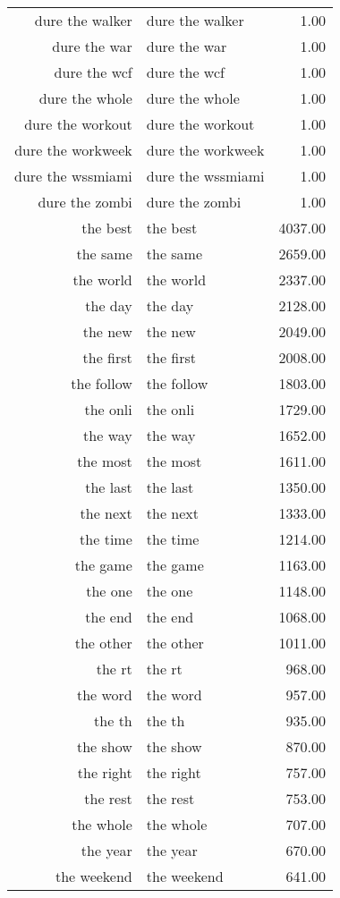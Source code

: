 \begin{table}[ht]
\begin{tabular}{rlr}
  dure the walker & dure the walker & 1.00 \\ 
  dure the war & dure the war & 1.00 \\ 
  dure the wcf & dure the wcf & 1.00 \\ 
  dure the whole & dure the whole & 1.00 \\ 
  dure the workout & dure the workout & 1.00 \\ 
  dure the workweek & dure the workweek & 1.00 \\ 
  dure the wssmiami & dure the wssmiami & 1.00 \\ 
  dure the zombi & dure the zombi & 1.00 \\ 
  the best & the best & 4037.00 \\ 
  the same & the same & 2659.00 \\ 
  the world & the world & 2337.00 \\ 
  the day & the day & 2128.00 \\ 
  the new & the new & 2049.00 \\ 
  the first & the first & 2008.00 \\ 
  the follow & the follow & 1803.00 \\ 
  the onli & the onli & 1729.00 \\ 
  the way & the way & 1652.00 \\ 
  the most & the most & 1611.00 \\ 
  the last & the last & 1350.00 \\ 
  the next & the next & 1333.00 \\ 
  the time & the time & 1214.00 \\ 
  the game & the game & 1163.00 \\ 
  the one & the one & 1148.00 \\ 
  the end & the end & 1068.00 \\ 
  the other & the other & 1011.00 \\ 
  the rt & the rt & 968.00 \\ 
  the word & the word & 957.00 \\ 
  the th & the th & 935.00 \\ 
  the show & the show & 870.00 \\ 
  the right & the right & 757.00 \\ 
  the rest & the rest & 753.00 \\ 
  the whole & the whole & 707.00 \\ 
  the year & the year & 670.00 \\ 
  the weekend & the weekend & 641.00 \\ 

\end{tabular}
\end{table}

